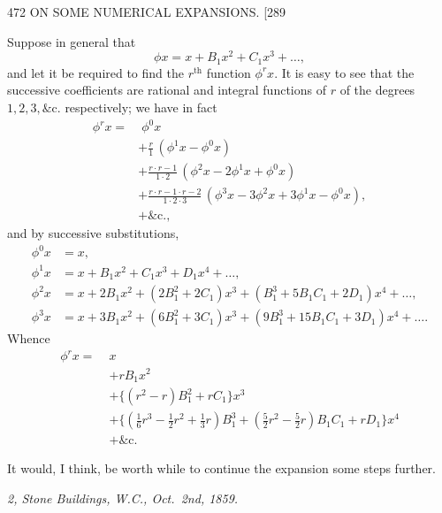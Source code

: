\documentclass[11pt]{article}
\begin{document}
\begin{center}
472 \hfill ON SOME NUMERICAL EXPANSIONS. \hfill \textsc{[289}
\end{center}

Suppose in general that
\[ \phi x=x+B_{1}x^{2}+C_{1}x^{3}+\ldots, \]
and let it be required to find the $r^{\text{th}}$ function $\phi^{r}x$. It is easy to see that the
successive coefficients are rational and integral functions of $r$ of the degrees $1, 2, 3, \&\text{c.}$
respectively; we have in fact
\begin{align*}
\phi^{r}x = & \;\phi^{0}x \\
& +\tfrac{r}{1}\,(\phi^{1}x-\phi^{0}x) \\
& +\tfrac{r\cdot r-1}{1\cdot 2}\,(\phi^{2}x-2\phi^{1}x+\phi^{0}x) \\
& +\tfrac{r\cdot r-1\cdot r-2}{1\cdot 2\cdot 3}\,(\phi^{3}x-3\phi^{2}x+3\phi^{1}x-\phi^{0}x), \\
& +\&\text{c.,}
\end{align*}
and by successive substitutions,
\begin{align*}
\phi^{0}x &= x, \\
\phi^{1}x &= x+B_{1}x^{2}+C_{1}x^{3}+D_{1}x^{4}+\ldots, \\
\phi^{2}x &= x+2B_{1}x^{2}+(2B_{1}^{2}+2C_{1})x^{3}+(B_{1}^{3}+5B_{1}C_{1}+2D_{1})x^{4}+\ldots, \\
\phi^{3}x &= x+3B_{1}x^{2}+(6B_{1}^{2}+3C_{1})x^{3}+(9B_{1}^{3}+15B_{1}C_{1}+3D_{1})x^{4}+\ldots.
\end{align*}
Whence
\begin{align*}
\phi^{r}x = \;& x \\
& +rB_{1}x^{2} \\
& +\{(r^{2}-r)B_{1}^{2}+rC_{1}\}x^{3} \\
& +\{(\tfrac{1}{6}r^{3}-\tfrac{1}{2}r^{2}+\tfrac{1}{3}r)B_{1}^{3}+(\tfrac{5}{2}r^{2}-\tfrac{5}{2}r)B_{1}C_{1}+rD_{1}\}x^{4} \\
& +\&\text{c.}
\end{align*}

\smallskip

It would, I think, be worth while to continue the expansion some steps further.

\smallskip

\hfill\textit{2, Stone Buildings, W.C., Oct.\ 2nd, 1859.}

\vfill
\end{document}
